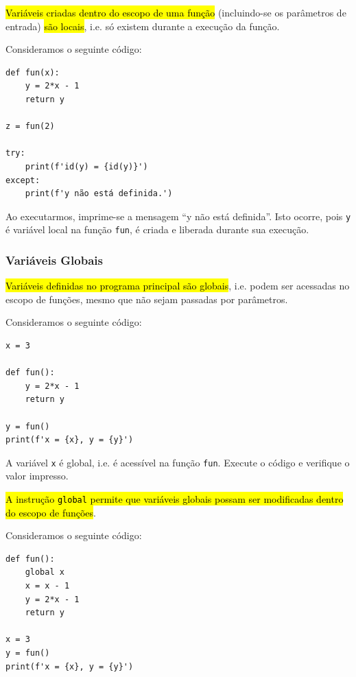 \hl{Variáveis criadas dentro do escopo de uma função} (incluindo-se os parâmetros de entrada) \hl{são locais}, i.e. só existem durante a execução da função.

\begin{ex}
  Consideramos o seguinte código:

\begin{lstlisting}
def fun(x):
    y = 2*x - 1
    return y

z = fun(2)

try:
    print(f'id(y) = {id(y)}')
except:
    print(f'y não está definida.')
\end{lstlisting}
  
Ao executarmos, imprime-se a mensagem ``y não está definida''. Isto ocorre, pois \lstinline+y+ é variável local na função \lstinline+fun+, é criada e liberada durante sua execução.
\end{ex}

\subsubsection{Variáveis Globais}

\hl{Variáveis definidas no programa principal são globais}, i.e. podem ser acessadas no escopo de funções, mesmo que não sejam passadas por parâmetros.

\begin{ex}
  Consideramos o seguinte código:

\begin{lstlisting}
x = 3

def fun():
    y = 2*x - 1
    return y

y = fun()
print(f'x = {x}, y = {y}')
\end{lstlisting}
  
A variável \lstinline+x+ é global, i.e. é acessível na função \lstinline+fun+. Execute o código e verifique o valor impresso.
\end{ex}

\hl{A instrução \texttt{global} permite que variáveis globais possam ser modificadas dentro do escopo de funções}.

\begin{ex}
  Consideramos o seguinte código:

\begin{lstlisting}
def fun():
    global x
    x = x - 1
    y = 2*x - 1
    return y

x = 3
y = fun()
print(f'x = {x}, y = {y}')
\end{lstlisting}

\end{ex}

